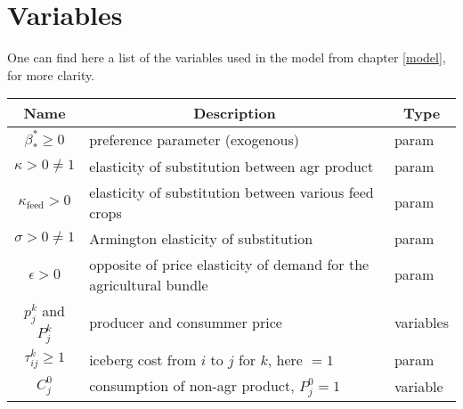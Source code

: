 \section{Variables}\label{appendix:variables}

One can find here a list of the variables used in the model from chapter \ref{model}, for more clarity.

\begin{table}[h!]
    \begin{tabular}{c|l|l}
        \multicolumn{1}{c}{\textbf{Name}}           & \multicolumn{1}{|c|}{\textbf{Description}}                         & \multicolumn{1}{c}{\textbf{Type}} \\
        \hline
        $\beta_*^* \ge 0$                           & preference parameter (exogenous)                                   & param                             \\

        $\kappa > 0 \neq 1$                         & elasticity of substitution between agr product                     & param                             \\

        $\kappa_{\text{feed}} > 0$                  & elasticity of substitution between various feed crops              & param                             \\

        $\sigma > 0 \neq 1$                         & Armington elasticity of substitution                               & param                             \\

        $\epsilon > 0$                              & opposite of price elasticity of demand for the agricultural bundle & param                             \\

        $p_j^k$ and $P_j^k$                         & producer and consummer price                                       & variables                         \\

        $\tau_{ij}^k \ge 1$                         & iceberg cost from $i$ to $j$ for $k$, here $=1$                    & param                             \\

        $C_j^0$                                     & consumption of non-agr product, $P_j^0 = 1$                        & variable                          \\


\end{tabular}
\end{table}
